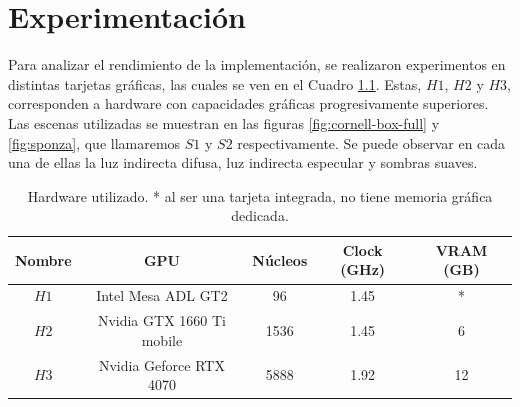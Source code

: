 \graphicspath{{chapters/5_experimentos/figures/}}

\chapter{Experimentación}\label{chap:experiments}

Para analizar el rendimiento de la implementación, se realizaron experimentos en distintas tarjetas gráficas, las cuales se ven en el Cuadro \ref{tab:hardware-used}.
Estas, $H1$, $H2$ y $H3$, corresponden a hardware con capacidades gráficas progresivamente superiores.
Las escenas utilizadas se muestran en las figuras \ref{fig:cornell-box-full} y \ref{fig:sponza}, que llamaremos $S1$ y $S2$ respectivamente.
Se puede observar en cada una de ellas la luz indirecta difusa, luz indirecta especular y sombras suaves.

\begin{table}[ht]
	\centering
	\begin{tabular}{|c|c|c|c|c|}
		\hline
		\textbf{Nombre} & \textbf{GPU} & \textbf{Núcleos} & \textbf{Clock (GHz)} & \textbf{VRAM (GB)} \\
		\hline
		$H1$ & Intel Mesa ADL GT2 & 96 & 1.45 & * \\
		\hline
		$H2$ & Nvidia GTX 1660 Ti mobile & 1536 & 1.45 & 6 \\
		\hline
		$H3$ & Nvidia Geforce RTX 4070 & 5888 & 1.92 & 12 \\
		\hline
	\end{tabular}
	\caption{Hardware utilizado. * al ser una tarjeta integrada, no tiene memoria gráfica dedicada.}
	\label{tab:hardware-used}
\end{table}

